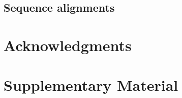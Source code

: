 \documentclass[9pt,lineno]{elife}
\begin{document}
\subsection*{Sequence alignments}

\section{Acknowledgments}

\nocite{*} %


\section*{Supplementary Material}

\end{document}
